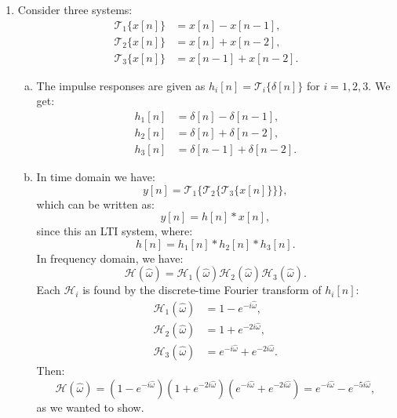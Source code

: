 \begin{enumerate}
  \item Consider three systems:
        \begin{align*}
          \mathcal{T}_{1}\{x[n]\} & =x[n]-x[n-1],   \\
          \mathcal{T}_{2}\{x[n]\} & =x[n]+x[n-2],   \\
          \mathcal{T}_{3}\{x[n]\} & =x[n-1]+x[n-2].
        \end{align*}

        \begin{enumerate}[a)]
          \item The impulse responses are given as $h_{i}[n]=\mathcal{T}_{i}\{\delta[n]\}$ for $i=1,2,3$. We get:
                \begin{align*}
                  h_{1}[n] & =\delta[n]-\delta[n-1],   \\
                  h_{2}[n] & =\delta[n]+\delta[n-2],   \\
                  h_{3}[n] & =\delta[n-1]+\delta[n-2].
                \end{align*}

          \item In time domain we have:
                \[ y[n] = \mathcal{T}_{1}\{\mathcal{T}_{2}\{\mathcal{T}_{3}\{x[n]\}\}\}, \]
                which can be written as:
                \[ y[n] = h[n]*x[n], \]
                since this an LTI system, where:
                \[ h[n] = h_{1}[n]*h_{2}[n]*h_{3}[n]. \]
                In frequency domain, we have:
                \[ \mathcal{H}(\hat{\omega})=\mathcal{H}_{1}(\hat{\omega})\mathcal{H}_{2}(\hat{\omega})\mathcal{H}_{3}(\hat{\omega}). \]
                Each $\mathcal{H}_{i}$ is found by the discrete-time Fourier transform of $h_{i}[n]$:
                \begin{align*}
                  \mathcal{H}_{1}(\hat{\omega}) & =1-e^{-i\hat{\omega}},                   \\
                  \mathcal{H}_{2}(\hat{\omega}) & =1+e^{-2i\hat{\omega}},                  \\
                  \mathcal{H}_{3}(\hat{\omega}) & =e^{-i\hat{\omega}}+e^{-2i\hat{\omega}}.
                \end{align*}
                Then:
                \[ \mathcal{H}(\hat{\omega})=(1-e^{-i\hat{\omega}})(1+e^{-2i\hat{\omega}})(e^{-i\hat{\omega}}+e^{-2i\hat{\omega}})=e^{-i\hat{\omega}}-e^{-5i\hat{\omega}}, \]
                as we wanted to show.
        \end{enumerate}


\end{enumerate}
